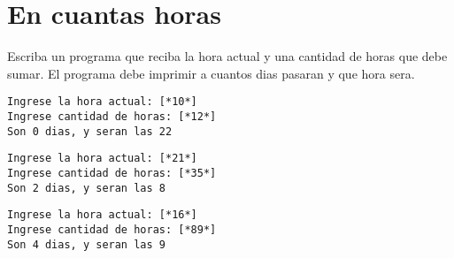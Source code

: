 \section{En cuantas horas}
Escriba un programa que reciba la hora actual y una cantidad de horas que debe sumar. El programa debe imprimir a cuantos dias pasaran y que hora sera.

\begin{lstlisting}[style=consola]
Ingrese la hora actual: [*10*]
Ingrese cantidad de horas: [*12*]
Son 0 dias, y seran las 22
\end{lstlisting}

\begin{lstlisting}[style=consola]
Ingrese la hora actual: [*21*]
Ingrese cantidad de horas: [*35*]
Son 2 dias, y seran las 8
\end{lstlisting}

\begin{lstlisting}[style=consola]
Ingrese la hora actual: [*16*]
Ingrese cantidad de horas: [*89*]
Son 4 dias, y seran las 9
\end{lstlisting}
